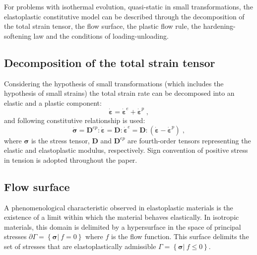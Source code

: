 \documentclass[Journal,letterpaper]{ascelike-new}
\newcommand{\Dsdee}{\boldsymbol{D}}
\newcommand{\Dsdep}{\boldsymbol{D}^{ep}}
\newcommand{\dstrain}{\boldsymbol{\dot{\varepsilon}}}
\newcommand{\dstraine}{\boldsymbol{\dot{\varepsilon}}^{e}}
\newcommand{\dstrainp}{\boldsymbol{\dot{\varepsilon}}^{p}}
\newcommand{\dstress}{\boldsymbol{\dot{\sigma}}}
\newcommand{\stress}{\boldsymbol{\sigma}}
\begin{document}
For problems with isothermal evolution, quasi-static in small transformations, the elastoplastic constitutive model can be described through the decomposition of the total strain tensor, the flow surface, the plastic flow rule, the hardening-softening law and the conditions of loading-unloading.

\subsection{Decomposition of the total strain tensor}

Considering the hypothesis of small transformations (which includes the hypothesis of small strains) the total strain rate can be decomposed into an elastic and a plastic component:
\begin{equation} \label{eq_decomposition_plastic}
    \dstrain=\dstraine + \dstrainp\;,
\end{equation}
and following constitutive relationship is used:
\begin{equation} \label{eq_constitutive_relationship_plastic}
    \dstress = \Dsdep : \dstrain = \Dsdee : \dstraine = \Dsdee : (\dstrain - \dstrainp)\;,
\end{equation}
where $\stress$ is the stress tensor, $\Dsdee$  and $\Dsdep$ are fourth-order tensors representing the elastic and elastoplastic modulus, respectively. Sign convention of positive stress in tension is adopted throughout the paper.

\subsection{Flow surface}

A phenomenological characteristic observed in elastoplastic
materials is the existence of a limit within which the material behaves elastically. In isotropic materials, this domain is delimited by a hypersurface in the space of principal stresses $\partial \Gamma = \left\{ \stress |~f = 0 \right\}$ where $f$ is the flow function. This surface delimits the set of stresses that are elastoplastically admissible $\Gamma = \left\{ \stress | ~f \leq 0 \right\}$.
\end{document}
